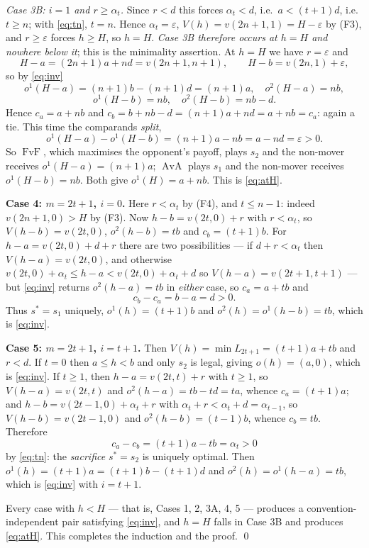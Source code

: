 \documentclass[11pt]{amsart}
\theoremstyle{definition}
\theoremstyle{remark}
\DeclareMathOperator{\FvF}{FvF}
\DeclareMathOperator{\AvA}{AvA}
\begin{document}
\emph{Case 3B: $i=1$ and $r\ge\alpha_t$.} Since $r<d$ this forces
$\alpha_t<d$, i.e.\ $a<(t+1)d$, i.e.\ $t\ge n$; with \eqref{eq:tn}, $t=n$.
Hence $\alpha_t=\varepsilon$, $V(h)=v(2n+1,1)=H-\varepsilon$ by (F3), and
$r\ge\varepsilon$ forces $h\ge H$, so $h=H$. \emph{Case 3B therefore occurs at
$h=H$ and nowhere below it}; this is the minimality assertion. At $h=H$ we have
$r=\varepsilon$ and
\[
  H-a=(2n+1)a+nd=v(2n+1,n+1),\qquad
  H-b=v(2n,1)+\varepsilon ,
\]
so by \eqref{eq:inv}
\[
  o^1(H-a)=(n+1)b-(n+1)d=(n+1)a,\quad o^2(H-a)=nb,
\]
\[
  o^1(H-b)=nb,\quad o^2(H-b)=nb-d .
\]
Hence $c_a=a+nb$ and $c_b=b+nb-d=(n+1)a+nd=a+nb=c_a$: again a tie. This time
the comparands \emph{split},
\[
  o^1(H-a)-o^1(H-b)=(n+1)a-nb=a-nd=\varepsilon>0 .
\]
So $\FvF$, which maximises the opponent's payoff, plays $s_2$ and the non-mover
receives $o^1(H-a)=(n+1)a$; $\AvA$ plays $s_1$ and the non-mover receives
$o^1(H-b)=nb$. Both give $o^1(H)=a+nb$. This is \eqref{eq:atH}.

\medskip
\noindent\textbf{Case 4: $m=2t+1$, $i=0$.}
Here $r<\alpha_t$ by (F4), and $t\le n-1$: indeed $v(2n+1,0)>H$ by (F3). Now
$h-b=v(2t,0)+r$ with $r<\alpha_t$, so $V(h-b)=v(2t,0)$, $o^2(h-b)=tb$ and
$c_b=(t+1)b$. For $h-a=v(2t,0)+d+r$ there are two possibilities --- if
$d+r<\alpha_t$ then $V(h-a)=v(2t,0)$, and otherwise
$v(2t,0)+\alpha_t\le h-a<v(2t,0)+\alpha_t+d$ so $V(h-a)=v(2t+1,t+1)$ --- but
\eqref{eq:inv} returns $o^2(h-a)=tb$ in \emph{either} case, so $c_a=a+tb$ and
\[
  c_b-c_a=b-a=d>0 .
\]
Thus $s^*=s_1$ uniquely, $o^1(h)=(t+1)b$ and $o^2(h)=o^1(h-b)=tb$, which is
\eqref{eq:inv}.

\medskip
\noindent\textbf{Case 5: $m=2t+1$, $i=t+1$.}
Then $V(h)=\min L_{2t+1}=(t+1)a+tb$ and $r<d$. If $t=0$ then $a\le h<b$ and
only $s_2$ is legal, giving $o(h)=(a,0)$, which is \eqref{eq:inv}. If $t\ge1$,
then $h-a=v(2t,t)+r$ with $t\ge1$, so $V(h-a)=v(2t,t)$ and
$o^2(h-a)=tb-td=ta$, whence $c_a=(t+1)a$; and
$h-b=v(2t-1,0)+\alpha_t+r$ with $\alpha_t+r<\alpha_t+d=\alpha_{t-1}$, so
$V(h-b)=v(2t-1,0)$ and $o^2(h-b)=(t-1)b$, whence $c_b=tb$. Therefore
\[
  c_a-c_b=(t+1)a-tb=\alpha_t>0
\]
by \eqref{eq:tn}: the \emph{sacrifice} $s^*=s_2$ is uniquely optimal. Then
$o^1(h)=(t+1)a=(t+1)b-(t+1)d$ and $o^2(h)=o^1(h-a)=tb$, which is
\eqref{eq:inv} with $i=t+1$.

\medskip
Every case with $h<H$ --- that is, Cases 1, 2, 3A, 4, 5 --- produces a
convention-independent pair satisfying \eqref{eq:inv}, and $h=H$ falls in
Case 3B and produces \eqref{eq:atH}. This completes the induction and the
proof. \qed
\end{document}
